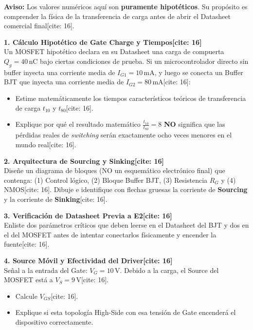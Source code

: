 \documentclass[11pt, a4paper]{article}
\begin{document}
\begin{tcolorbox}[colback=ucbblue!5, colframe=ucbblue, title=\textbf{Taller E2: Dimensionamiento Conceptual de Buffer BJT (Uso Estudiante)[cite: 16]}]
    \textbf{Aviso:} Los valores numéricos aquí son \textbf{puramente hipotéticos}. Su propósito es comprender la física de la transferencia de carga antes de abrir el Datasheet comercial final[cite: 16].
\end{tcolorbox}

\textbf{1. Cálculo Hipotético de Gate Charge y Tiempos[cite: 16]} \\
Un MOSFET hipotético declara en su Datasheet una carga de compuerta $Q_g = 40\,\text{nC}$ bajo ciertas condiciones de prueba.
Si un microcontrolador directo sin buffer inyecta una corriente media de $I_{G1} = 10\,\text{mA}$, y luego se conecta un Buffer BJT que inyecta una corriente media de $I_{G2} = 80\,\text{mA}$[cite: 16]:
\begin{itemize}
    \item[a)] Estime matemáticamente los tiempos característicos teóricos de transferencia de carga $t_{10}$ y $t_{80}$[cite: 16].
    \item[b)] Explique por qué el resultado matemático $\frac{t_{10}}{t_{80}} = 8$ \textbf{NO} significa que las pérdidas reales de \textit{switching} serán exactamente ocho veces menores en el mundo real[cite: 16].
\end{itemize}
\vspace{2.5cm}

\textbf{2. Arquitectura de Sourcing y Sinking[cite: 16]} \\
Diseñe un diagrama de bloques (NO un esquemático electrónico final) que contenga: (1) Control lógico, (2) Bloque Buffer BJT, (3) Resistencia $R_G$ y (4) NMOS[cite: 16].
Dibuje e identifique con flechas gruesas la corriente de \textbf{Sourcing} y la corriente de \textbf{Sinking}[cite: 16].
\vspace{3.5cm}

\textbf{3. Verificación de Datasheet Previa a E2[cite: 16]} \\
Enliste dos parámetros críticos que deben leerse en el Datasheet del BJT y dos en el del MOSFET antes de intentar conectarlos físicamente y encender la fuente[cite: 16].
\vspace{2.5cm}

\textbf{4. Source Móvil y Efectividad del Driver[cite: 16]} \\
Señal a la entrada del Gate: $V_G = 10\,\text{V}$. Debido a la carga, el Source del MOSFET está a $V_S = 9\,\text{V}$[cite: 16].
\begin{itemize}
    \item[a)] Calcule $V_{GS}$[cite: 16].
    \item[b)] Explique si esta topología High-Side con esa tensión de Gate encenderá el dispositivo correctamente.
\end{itemize}
\vspace{2.5cm}
\end{document}
